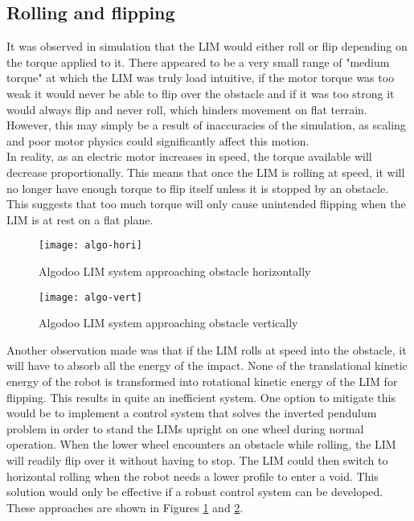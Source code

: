 \subsection{Rolling and flipping}

It was observed in simulation that the LIM would either roll or flip depending on the torque applied to it. There appeared to be a very small range of "medium torque" at which the LIM was truly load intuitive, if the motor torque was too weak it would never be able to flip over the obstacle and if it was too strong it would always flip and never roll, which hinders movement on flat terrain. However, this may simply be a result of inaccuracies of the simulation, as scaling and poor motor physics could significantly affect this motion. \\

In reality, as an electric motor increases in speed, the torque available will decrease proportionally. This means that once the LIM is rolling at speed, it will no longer have enough torque to flip itself unless it is stopped by an obstacle. This suggests that too much torque will only cause unintended flipping when the LIM is at rest on a flat plane.\\

\begin{figure}[h]
	\centering
	\texttt{[image: algo-hori]}
	\caption{Algodoo LIM system approaching obstacle horizontally}
	\label{algo-hori}
\end{figure}

\begin{figure}[h]
	\centering
	\texttt{[image: algo-vert]}
	\caption{Algodoo LIM system approaching obstacle vertically}
	\label{algo-vert}
\end{figure}

Another observation made was that if the LIM rolls at speed into the obstacle, it will have to absorb all the energy of the impact. None of the translational kinetic energy of the robot is transformed into rotational kinetic energy of the LIM for flipping. This results in quite an inefficient system. One option to mitigate this would be to implement a control system that solves the inverted pendulum problem in order to stand the LIMs upright on one wheel during normal operation. When the lower wheel encounters an obstacle while rolling, the LIM will readily flip over it without having to stop. The LIM could then switch to horizontal rolling when the robot needs a lower profile to enter a void. This solution would only be effective if a robust control system can be developed. These approaches are shown in Figures \ref{algo-hori} and \ref{algo-vert}.